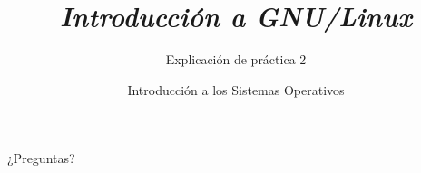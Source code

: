 


\author{Introducción a los Sistemas Operativos}



\title{\textit{Introducción a GNU/Linux}}
\subtitle{Explicación de práctica 2}
\begin{frame}
  \titlepage
\end{frame}


\begin{frame}{}
  \begin{center}
    \vfill
    \huge ¿Preguntas?
    \vfill
  \end{center}
\end{frame}

